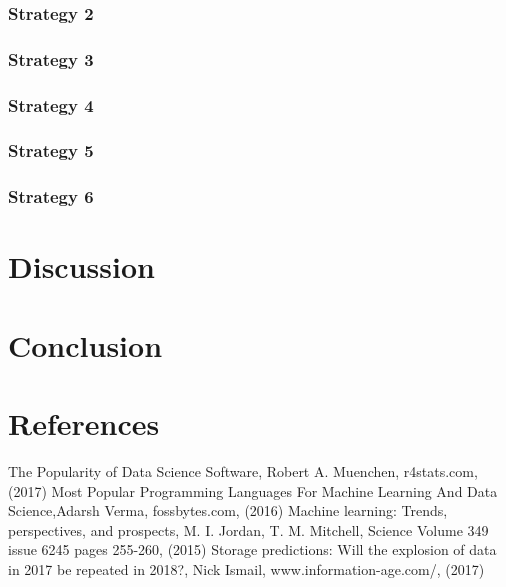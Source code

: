 \documentclass[a4paper,10pt]{article}
\begin{document}
\subsubsection{Strategy 2} 



\subsubsection{Strategy 3}


\subsubsection{Strategy 4}



\subsubsection{Strategy 5}


\subsubsection{Strategy 6}

\section{Discussion} \label{Chapter5}

\newpage
\section{Conclusion} \label{Chapter6}

\section{References}
\begingroup
\begin{thebibliography}{9}
 The Popularity of Data Science Software, Robert A. Muenchen, r4stats.com, (2017)
 Most Popular Programming Languages For Machine Learning And Data Science,Adarsh Verma, fossbytes.com, (2016)
Machine learning: Trends, perspectives, and prospects, M. I. Jordan, T. M. Mitchell, Science Volume 349 issue 6245 pages 255-260, (2015)
 Storage predictions: Will the explosion of data in 2017 be repeated in 2018?, Nick Ismail, www.information-age.com/, (2017)
     
\end{thebibliography}
\endgroup
\end{document}

